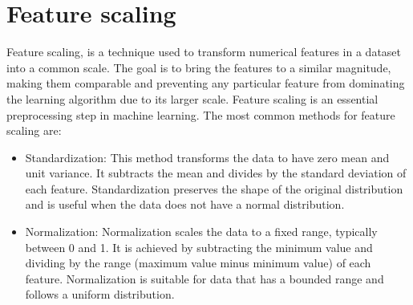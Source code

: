 \documentclass[
]{book}
\newenvironment{Shaded}{\begin{snugshade}}{\end{snugshade}}
\newcommand{\AttributeTok}[1]{\textcolor[rgb]{0.13,0.29,0.53}{#1}}
\newcommand{\CommentTok}[1]{\textcolor[rgb]{0.56,0.35,0.01}{\textit{#1}}}
\newcommand{\DecValTok}[1]{\textcolor[rgb]{0.00,0.00,0.81}{#1}}
\newcommand{\FunctionTok}[1]{\textcolor[rgb]{0.13,0.29,0.53}{\textbf{#1}}}
\newcommand{\NormalTok}[1]{#1}
\newcommand{\OtherTok}[1]{\textcolor[rgb]{0.56,0.35,0.01}{#1}}
\newcommand{\SpecialCharTok}[1]{\textcolor[rgb]{0.81,0.36,0.00}{\textbf{#1}}}
\newcommand{\StringTok}[1]{\textcolor[rgb]{0.31,0.60,0.02}{#1}}
\begin{document}
\begin{Shaded}
\end{Shaded}

\hypertarget{feature-scaling}{%
\section{\texorpdfstring{Feature scaling\\
}{Feature scaling }}\label{feature-scaling}}

Feature scaling, is a technique used to transform numerical features in a dataset into a common scale. The goal is to bring the features to a similar magnitude, making them comparable and preventing any particular feature from dominating the learning algorithm due to its larger scale. Feature scaling is an essential preprocessing step in machine learning.
The most common methods for feature scaling are:

\begin{itemize}
\item
  Standardization: This method transforms the data to have zero mean and unit variance. It subtracts the mean and divides by the standard deviation of each feature. Standardization preserves the shape of the original distribution and is useful when the data does not have a normal distribution.
\item
  Normalization: Normalization scales the data to a fixed range, typically between 0 and 1. It is achieved by subtracting the minimum value and dividing by the range (maximum value minus minimum value) of each feature. Normalization is suitable for data that has a bounded range and follows a uniform distribution.
\end{itemize}
\end{document}
